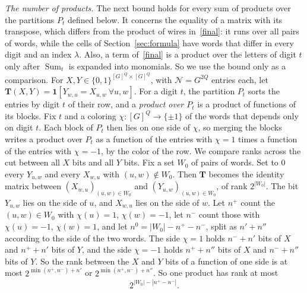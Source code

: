 \documentclass[11pt]{article}
\numberwithin{equation}{section}
\theoremstyle{remark}
\newcommand{\bits}{\{0,1\}}
\newcommand{\T}{\mathbf{T}}
\newcommand{\NN}{\mathcal{N}}
\begin{document}
\emph{The number of products.} The next bound holds for every sum of products over the partitions $P_t$ defined below. It concerns the equality of a matrix with its transpose, which differs from the product of wires in~\eqref{final}: it runs over all pairs of words, while the cells of Section~\ref{sec:formula} have words that differ in every digit and an index $\lambda$. Also, a term of~\eqref{final} is a product over the letters of digit $t$ only after $\operatorname{Sum}_t$ is expanded into monomials. So we use the bound only as a comparison. For $X,Y\in\bits^{[G]^Q\times[G]^Q}$, with $\NN=G^{2Q}$ entries each, let $\T(X,Y)=\mathbf 1[Y_{w,u}=X_{u,w}\ \forall u,w]$. For a digit $t$, the partition $P_t$ sorts the entries by digit $t$ of their row, and a \emph{product over $P_t$} is a product of functions of its blocks. Fix $t$ and a coloring $\chi:[G]^Q\to\{\pm1\}$ of the words that depends only on digit $t$. Each block of $P_t$ then lies on one side of $\chi$, so merging the blocks writes a product over $P_t$ as a function of the entries with $\chi=1$ times a function of the entries with $\chi=-1$, by the color of the row. We compare ranks across the cut between all $X$ bits and all $Y$ bits. Fix a set $W_0$ of pairs of words. Set to $0$ every $Y_{u,w}$ and every $X_{w,u}$ with $(u,w)\notin W_0$. Then $\T$ becomes the identity matrix between $(X_{w,u})_{(u,w)\in W_0}$ and $(Y_{u,w})_{(u,w)\in W_0}$, of rank $2^{|W_0|}$. The bit $Y_{u,w}$ lies on the side of $u$, and $X_{w,u}$ lies on the side of $w$. Let $n^+$ count the $(u,w)\in W_0$ with $\chi(u)=1$, $\chi(w)=-1$, let $n^-$ count those with $\chi(u)=-1$, $\chi(w)=1$, and let $n^0=|W_0|-n^+-n^-$, split as $n'+n''$ according to the side of the two words. The side $\chi=1$ holds $n^-+n'$ bits of $X$ and $n^++n'$ bits of $Y$, and the side $\chi=-1$ holds $n^++n''$ bits of $X$ and $n^-+n''$ bits of $Y$. So the rank between the $X$ and $Y$ bits of a function of one side is at most $2^{\min(n^+,n^-)+n'}$ or $2^{\min(n^+,n^-)+n''}$. So one product has rank at most
\begin{equation}\label{eq:rank}
 2^{|W_0|-|n^+-n^-|}.
\end{equation}
\end{document}
